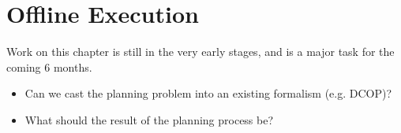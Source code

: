 \chapter{Offline Execution}\label{ch:offline-exec}

Work on this chapter is still in the very early stages, and is a major task for the coming 6 months.

\begin{itemize}
\item Can we cast the planning problem into an existing formalism (e.g. DCOP)?
\item What should the result of the planning process be?
\end{itemize}

